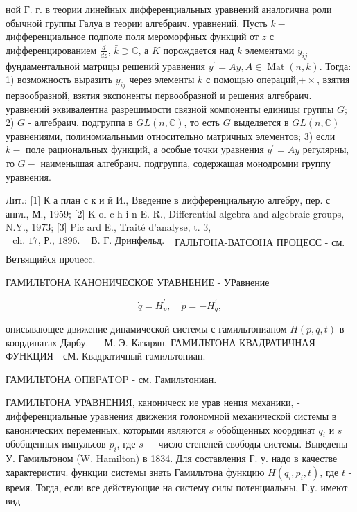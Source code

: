 \documentclass[10pt]{article}
\begin{document}
ной Г. г. в теории линейных дифференциальных уравнений аналогична роли обычной группы Галуа в теории алгебраич. уравнений. Пусть $k-$ дифференциальное подполе поля мероморфных функций от $z$ с дифференцированием $\frac{d}{d z}$, $\bar{k} \supset \mathbb{C}$, а $K$ порождается над $k$ элементами $y_{i j}$ фундаментальной матрицы решений уравнения $y^{\prime}=A y, A \in \operatorname{Mat}(n, k)$. Тогда: 1) возможность выразить $y_{i j}$ через элементы $k$ с помощью операций,$+ \times$, взятия первообразной, взятия экспоненты первообразной и решения алгебраич. уравнений эквивалентна разрешимости связной компоненты единицы группы $G$; 2) $G$ - алгебраич. подгруппа в $G L(n, \mathbb{C})$, то есть $G$ выделяется в $G L(n, \mathbb{C})$ уравнениями, полиномиальными относительно матричных элементов; 3) если $k-$ поле рациональных функций, а особые точки уравнения $y^{\prime}=A y$ регулярны, то $G-$ наименышая алгебраич. подгруппа, содержащая монодромии группу уравнения.



Лит.: [1] К а план с к и й И., Введение в дифференциальную алгебру, пер. с англ., М., 1959; [2] K ol c h i n E. R., Differential algebra and algebraic groups, N.Y., 1973; [3] Pic ard E., Traité d'analyse, t. 3, $\begin{array}{ll}\text { ch. 17, Р., } 1896 . & \text { В. Г. Дринфельд. } \\ & \end{array}$ ГАЛЬТОНА-ВАТСОНА ПРОЦЕСС - см. Ветвящийся проuecc.



ГАМИЛЬТОНА КАНОНИЧЕСКОЕ УРАВНЕНИЕ - УРавнение



\[

\dot{q}=H_{p}^{\prime}, \quad \dot{p}=-H_{q}^{\prime},

\]



описывающее движение динамической системы с гамильтонианом $H(p, q, t)$ в координатах Дарбу. $\quad$ М. Э. Казарян. ГАМИЛЬТОНА КВАДРАТИЧНАЯ ФУНКЦИЯ - сМ. Квадратичный гамильтониан.



ГАМИЛЬТОНА OПEPATOP - см. Гамильтониан.



ГАМИЛЬТОНА УРАВНЕНИЯ, каноническ ие урав нения механики, - дифференциальные уравнения движения голономной механической системы в канонических переменных, которыми являются $s$ обобщенных координат $q_{i}$ и $s$ обобщенных импульсов $p_{i}$, где $s-$ число степеней свободы системы. Выведены У. Гамильтоном (W. Hamilton) в 1834. Для составления Г. у. надо в качестве характеристич. функции системы знать Гамильтона функцию $H\left(q_{i}, p_{i}, t\right)$, где $t$ - время. Тогда, если все действующие на систему силы потенциальны, Г.у. имеют вид
\end{document}
